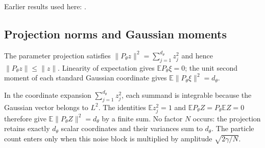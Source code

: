 \documentclass[11pt,a4paper]{report}
\begin{document}
Earlier results used here: \cite[Section~3.1.1]{LangevinLean2026IPLA}.
\subsection{\texorpdfstring{Projection norms and Gaussian moments}{Projection norms and Gaussian moments}}
\label{report-step-ProximalLangevin-MYPGDNoise-lean-2}


The parameter projection satisfies \(\|P_\theta z\|^2=\sum_{j=1}^{d_\theta}z_j^2\) and hence \(\|P_\theta z\|\le\|z\|\). Linearity of expectation gives \(\mathbb E P_\theta\xi=0\); the unit second moment of each standard Gaussian coordinate gives \(\mathbb E\|P_\theta\xi\|^2=d_\theta\).



In the coordinate expansion \(\sum_{j=1}^{d_\theta}z_j^2\), each summand is integrable because the Gaussian vector belongs to \(L^2\). The identities \(\mathbb E z_j^2=1\) and \(\mathbb E P_\theta Z=P_\theta\mathbb EZ=0\) therefore give \(\mathbb E\|P_\theta Z\|^2=d_\theta\) by a finite sum. No factor \(N\) occurs: the projection retains exactly \(d_\theta\) scalar coordinates and their variances sum to \(d_\theta\). The particle count enters only when this noise block is multiplied by amplitude \(\sqrt{2\gamma/N}\).
\end{document}
